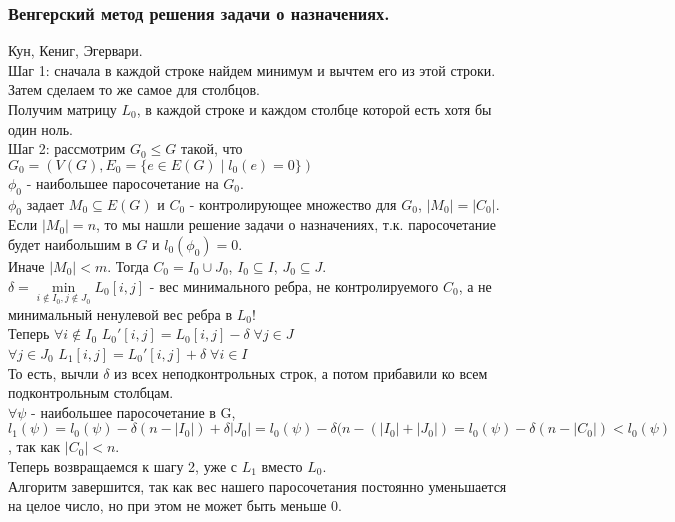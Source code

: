 \subsubsection{Венгерский метод решения задачи о назначениях.}
Кун, Кениг, Эгервари.\\
Шаг 1: сначала в каждой строке найдем минимум и вычтем его из этой строки. Затем сделаем то же самое для столбцов.\\
Получим матрицу $L_0$, в каждой строке и каждом столбце которой есть хотя бы один ноль.\\
Шаг 2: рассмотрим $G_0 \leq G$ такой, что $G_0 = (V(G), E_0 = \{e \in E(G) \; | \; l_0(e) = 0\})$\\
$\phi_0$ - наибольшее паросочетание на $G_0$.\\
$\phi_0$ задает $M_0 \subseteq E(G)$ и $C_0$ - контролирующее множество для $G_0$, $|M_0| = |C_0|$.\\
Если $|M_0| = n$, то мы нашли решение задачи о назначениях, т.к. паросочетание будет наибольшим в $G$ и $l_0(\phi_0) = 0$.\\
Иначе $|M_0| < m$. Тогда $C_0 = I_0 \cup J_0$, $I_0 \subseteq I$, $J_0 \subseteq J$.\\
$\delta = \min\limits_{i \not\in I_0, j \not\in J_0} L_0[i,j]$ - вес минимального ребра, не контролируемого $C_0$, а не минимальный ненулевой вес ребра в $L_0$!\\
Теперь $\forall i \not\in I_0$ $L_0'[i, j] = L_0[i,j] - \delta \; \forall j \in J$\\
$\forall j \in J_0$ $L_1[i, j] = L_0'[i,j] + \delta \; \forall i \in I$\\
То есть, вычли $\delta$ из всех неподконтрольных строк, а потом прибавили ко всем подконтрольным столбцам.\\
$\forall \psi$ - наибольшее паросочетание в G, $l_1(\psi) = l_0(\psi) - \delta(n - |I_0|) + \delta|J_0| = l_0(\psi) - \delta(n - (|I_0| + |J_0|) = l_0(\psi) - \delta(n - |C_0|) < l_0(\psi)$, так как $|C_0| < n$.\\
Теперь возвращаемся к шагу 2, уже с $L_1$ вместо $L_0$.\\
Алгоритм завершится, так как вес нашего паросочетания постоянно уменьшается на целое число, но при этом не может быть меньше 0.